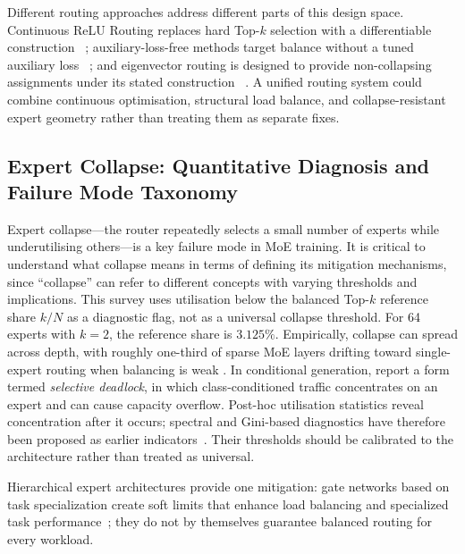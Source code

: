 \documentclass[10pt]{article}
\begin{document}
Different routing approaches address different parts of this design space.  Continuous
ReLU Routing replaces hard Top-$k$ selection with a differentiable construction
~\citep{wang2025remoefullydifferentiablemixtureofexperts}; auxiliary-loss-free methods
target balance without a tuned auxiliary loss
~\citep{wang2024auxiliarylossfreeloadbalancingstrategy}; and eigenvector routing is
designed to provide non-collapsing assignments under its stated construction
~\citep{do2026eigenvectorsexpertstrainingfreenoncollapsing}.  A unified routing system could combine continuous
optimisation, structural load balance, and collapse-resistant expert geometry rather
than treating them as separate fixes.

\subsection{Expert Collapse: Quantitative Diagnosis and Failure Mode Taxonomy}
\label{subsec:collapse}

Expert collapse---the router repeatedly selects a small number of experts while
underutilising others---is a key failure mode in MoE training.  It is
critical to understand what collapse means in terms of defining its mitigation
mechanisms, since ``collapse'' can refer to different concepts with varying
thresholds and implications.  This survey uses utilisation below the balanced Top-$k$ reference share $k/N$
as a diagnostic flag, not as a universal collapse threshold.  For 64 experts with
$k=2$, the reference share is $3.125\%$.  Empirically, collapse can spread across depth, with roughly one-third
of sparse MoE layers drifting toward single-expert routing when balancing is weak
\citep{sha2026sparsemixtureofexpertsroutingvisual}.  In conditional generation,
\citet{sha2026sparsemixtureofexpertsroutingvisual} report a form termed
\emph{selective deadlock}, in which class-conditioned traffic concentrates on an expert
and can cause capacity overflow.  Post-hoc utilisation statistics reveal concentration
after it occurs; spectral and Gini-based diagnostics have therefore been proposed as
earlier indicators~\citep{delibasoglu2026spectralmanifoldregularizationstable}.  Their
thresholds should be calibrated to the architecture rather than treated as universal.

Hierarchical expert architectures provide one mitigation: gate
networks based on task specialization create soft limits that enhance load balancing
and specialized task performance~\citep{wang2024homehierarchymultigateexperts}; they do
not by themselves guarantee balanced routing for every workload.
\end{document}
